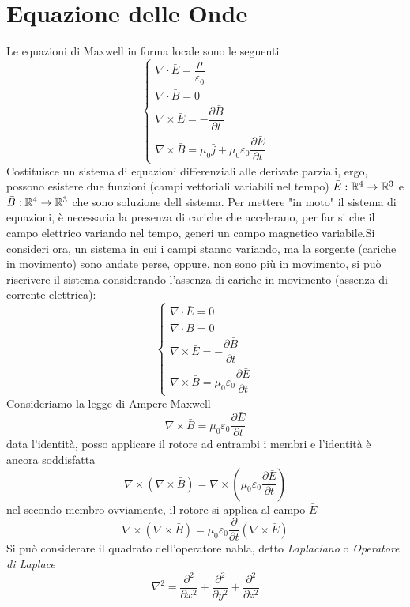 \documentclass[10pt, letterpaper]{report}
\begin{document}
\section{Equazione delle Onde}
Le equazioni di Maxwell in forma locale sono le seguenti 
$$\begin{cases}
    \nabla \cdot \bar E = \dfrac{\rho}{\varepsilon_0}\\ 
    \nabla \cdot \bar B = 0\\ 
    \nabla \times \bar E = -\dfrac{\partial \bar B }{\partial t}\\ 
    \nabla \times \bar B = \mu_0\bar j +\mu_0 \varepsilon_0 \dfrac{\partial \bar E}{\partial t}
\end{cases} $$
Costituisce un sistema di equazioni differenziali alle derivate parziali, ergo, possono esistere due funzioni (campi vettoriali variabili nel tempo) $\bar E : {\mathbb R}^4\rightarrow {\mathbb R}^3$ e $\bar B : {\mathbb R}^4\rightarrow {\mathbb R}^3$ che sono soluzione dell sistema. Per mettere "in moto" il sistema di equazioni, è necessaria la presenza di cariche che accelerano, per far si che il campo elettrico variando nel tempo, generi un campo magnetico variabile.\acc Si consideri ora, un sistema in cui i campi stanno variando, ma la sorgente (cariche in movimento) sono andate perse, oppure, non sono più in movimento, si può riscrivere il sistema considerando l'assenza di cariche in movimento (assenza di corrente elettrica):
$$\begin{cases}
    \nabla \cdot \bar E = 0\\ 
    \nabla \cdot \bar B = 0\\ 
    \nabla \times \bar E = -\dfrac{\partial \bar B }{\partial t}\\ 
    \nabla \times \bar B = \mu_0 \varepsilon_0 \dfrac{\partial \bar E}{\partial t}
\end{cases} $$
Consideriamo la legge di Ampere-Maxwell
$$ \nabla \times \bar B = \mu_0 \varepsilon_0 \dfrac{\partial \bar E}{\partial t}$$
data l'identità, posso applicare il rotore ad entrambi i membri e l'identità è ancora soddisfatta 
$$\nabla \times(\nabla \times \bar B )= \nabla \times (\mu_0 \varepsilon_0 \dfrac{\partial \bar E}{\partial t})$$
nel secondo membro ovviamente, il rotore si applica al campo $\bar E$
$$\nabla \times(\nabla \times \bar B )= \mu_0 \varepsilon_0 \dfrac{\partial }{\partial t}(\nabla \times \bar E)$$
 Si può considerare il quadrato dell'operatore nabla, detto \textit{Laplaciano}  o \textit{Operatore di Laplace}
$$ \nabla^2=\frac{\partial^2}{\partial x^2}+\frac{\partial^2}{\partial y^2}+\frac{\partial^2}{\partial z^2}$$
\end{document}
